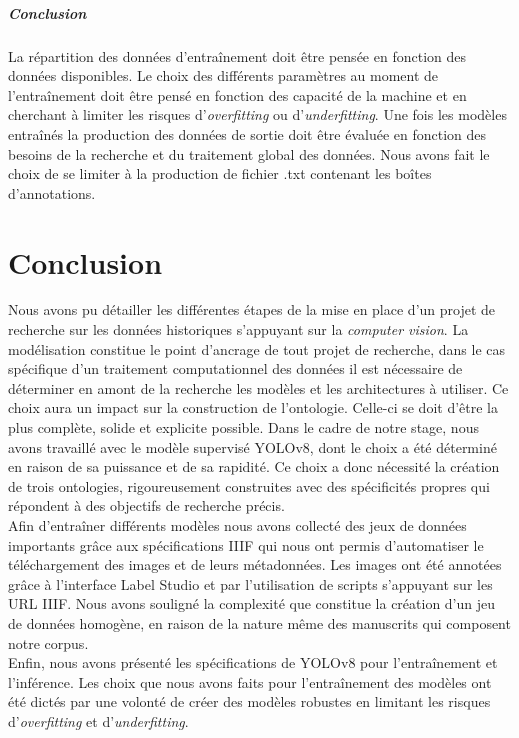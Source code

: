 \documentclass[12pt,twoside]{book}
\begin{document}
\paragraph{Conclusion} La répartition des données d'entraînement doit être pensée en fonction des données disponibles. Le choix des différents paramètres au moment de l'entraînement doit être pensé en fonction des capacité de la machine et en cherchant à limiter les risques d'\textit{overfitting} ou d'\textit{underfitting}. Une fois les modèles entraînés la production des données de sortie doit être évaluée en fonction des besoins de la recherche et du traitement global des données. Nous avons fait le choix de se limiter à la production de fichier .txt contenant les boîtes d'annotations.

\chapter{Conclusion}

Nous avons pu détailler les différentes étapes de la mise en place d’un projet de recherche sur les données historiques s’appuyant sur la \textit{computer vision}. La modélisation constitue le point d’ancrage de tout projet de recherche, dans le cas spécifique d’un traitement computationnel des données il est nécessaire de déterminer en amont de la recherche les modèles et les architectures à utiliser. Ce choix aura un impact sur la construction de l’ontologie. Celle-ci se doit d’être la plus complète, solide et explicite possible. Dans le cadre de notre stage, nous avons travaillé avec le modèle supervisé YOLOv8, dont le choix a été déterminé en raison de sa puissance et de sa rapidité. Ce choix a donc nécessité la création de trois ontologies, rigoureusement construites avec des spécificités propres qui répondent à des objectifs de recherche précis.\\

Afin d’entraîner différents modèles nous avons collecté des jeux de données importants grâce aux spécifications IIIF qui nous ont permis d’automatiser le téléchargement des images et de leurs métadonnées. Les images ont été annotées grâce à l’interface Label Studio et par l’utilisation de scripts s’appuyant sur les URL IIIF. Nous avons souligné la complexité que constitue la création d’un jeu de données homogène, en raison de la nature même des manuscrits qui composent notre corpus. \\

Enfin, nous avons présenté les spécifications de YOLOv8 pour l’entraînement et l’inférence. Les choix que nous avons faits pour l’entraînement des modèles ont été dictés par une volonté de créer des modèles robustes en limitant les risques d’\textit{overfitting} et d’\textit{underfitting}.
\end{document}
